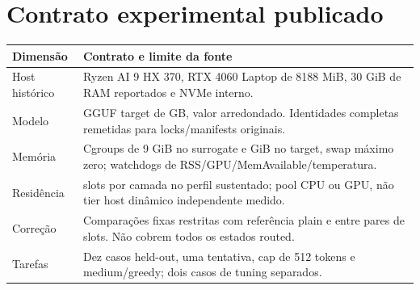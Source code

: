 \clearpage
\section{Contrato experimental publicado}
\begin{tabularx}{\linewidth}{@{}p{37mm}Y@{}}
\toprule \textbf{Dimensão} & \textbf{Contrato e limite da fonte}\\ \midrule
Host histórico & Ryzen AI 9 HX 370, RTX 4060 Laptop de 8188 MiB, 30 GiB de RAM reportados e NVMe interno.\\
Modelo & GGUF target de  GB, valor arredondado. Identidades completas remetidas para locks/manifests originais.\\
Memória & Cgroups de 9 GiB no surrogate e  GiB no target, swap máximo zero; watchdogs de RSS/GPU/MemAvailable/temperatura.\\
Residência &  slots por camada no perfil sustentado; pool CPU ou GPU, não tier host dinâmico independente medido.\\
Correção & Comparações fixas restritas com referência plain e entre pares de slots. Não cobrem todos os estados routed.\\
Tarefas & Dez casos held-out, uma tentativa, cap de 512 tokens e medium/greedy; dois casos de tuning separados.\\
\bottomrule
\end{tabularx}


